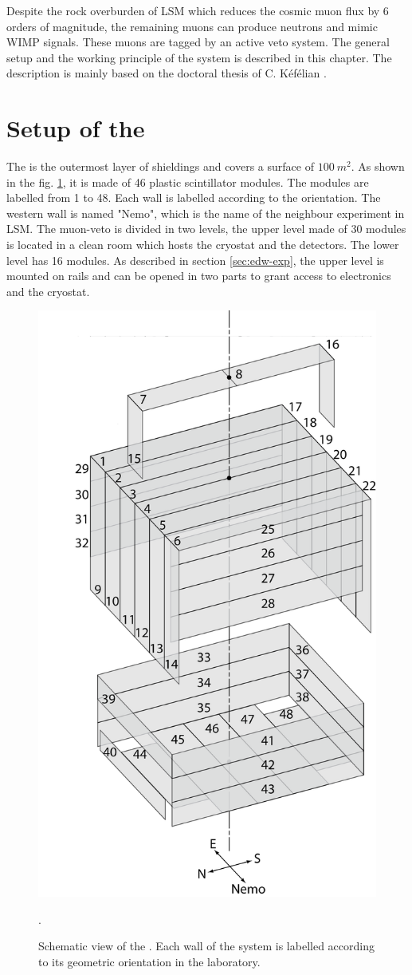 Despite the rock overburden of LSM which reduces the cosmic muon flux by 6 orders of magnitude, the remaining muons can produce neutrons and mimic WIMP signals. These muons are tagged by an active veto system. The general setup and the working principle of the system is described in this chapter. The description is mainly based on the doctoral thesis of C. K{\'{e}}f{\'{e}}lian \cite{Kef16}.



\section{Setup of the \mvs}
\label{sec:muon-setup}

The \mvs{} is the outermost layer of shieldings and covers a surface of $\SI{100}{m^{2}}$. As shown in the fig. \ref{fig:muon-setup}, it is made of 46 plastic scintillator modules. The modules are labelled from 1 to 48. Each wall is labelled according to the orientation. The western wall is named "Nemo", which is the name of the neighbour experiment in LSM.
The muon-veto is divided in two levels, the upper level made of 30 modules is located in a clean room which hosts the cryostat and the detectors. The lower level has 16 modules. As described in section \ref{sec:edw-exp}, the upper level is mounted on rails and can be opened in two parts to grant access to electronics and the cryostat.

\begin{figure}[ht!]
  \centering
  \includegraphics[width=0.5\textwidth{}]{./fig/Veto.png}
  \caption{Schematic view of the \mvs. Each wall of the system is labelled according to its geometric orientation in the laboratory. }.
  \label{fig:muon-setup}
\end{figure}

